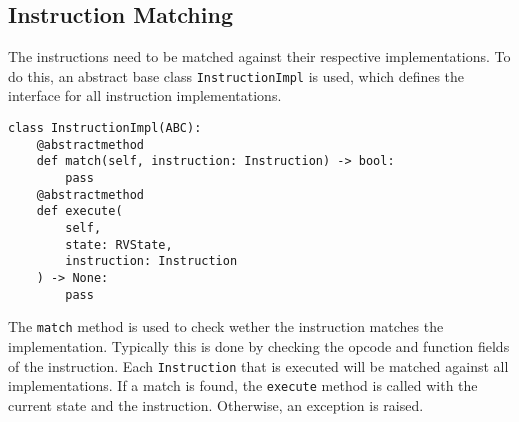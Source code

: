 \documentclass[sigconf]{acmart}
\begin{document}
\subsection{Instruction Matching}
The instructions need to be matched against their respective implementations. To do this, an abstract base class \texttt{InstructionImpl} is used, which defines the interface for all instruction implementations.
\begin{verbatim}
class InstructionImpl(ABC):
    @abstractmethod
    def match(self, instruction: Instruction) -> bool:
        pass
    @abstractmethod
    def execute(
        self, 
        state: RVState, 
        instruction: Instruction
    ) -> None:
        pass
\end{verbatim}
The \texttt{match} method is used to check wether the instruction matches the implementation. Typically this is done by checking the opcode and function fields of the instruction.
Each \texttt{Instruction} that is executed will be matched against all implementations. 
If a match is found, the \texttt{execute} method is called with the current state and the instruction. Otherwise, an exception is raised.
\end{document}
